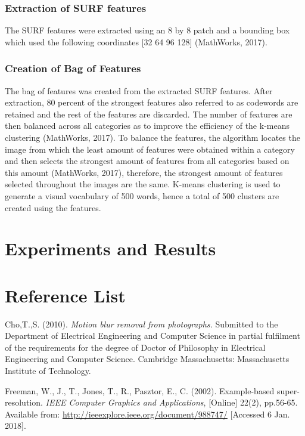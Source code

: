 \documentclass[a4paper, 12pt]{article}
\begin{document}
\subsubsection{Extraction of SURF features}
The SURF features were extracted using an 8 by 8 patch and a bounding box which used the following coordinates [32 64 96 128] (MathWorks, 2017). 

\subsubsection{Creation of Bag of Features}
The bag of features was created from the extracted SURF features. After extraction, 80 percent of the strongest features also referred to as codewords are retained and the rest of the features are discarded. The number of features are then balanced across all categories as to improve the efficiency of the k-means clustering (MathWorks, 2017). To balance the features, the algorithm locates the image from which the least amount of features were obtained within a category and then selects the strongest amount of features from all categories based on this amount (MathWorks, 2017), therefore, the strongest amount of features selected throughout the images are the same. K-means clustering is used to generate a visual vocabulary of 500 words, hence a total of 500 clusters are created using the features.

\newpage 
\section{ Experiments and Results }


 
\newpage
\section{Reference List} 

Cho,T.,S. (2010). \textit{Motion blur removal from photographs.} Submitted to the Department of Electrical Engineering and Computer Science in partial fulfilment of the requirements for the degree of Doctor of Philosophy in Electrical Engineering and Computer Science. Cambridge Massachusetts: Massachusetts Institute of Technology.
 
Freeman, W., J., T., Jones, T., R.,  Pasztor, E., C. (2002). Example-based super-resolution. \textit{IEEE Computer Graphics and Applications}, [Online] 22(2), pp.56-65. Available from: \url{http://ieeexplore.ieee.org/document/988747/} [Accessed 6 Jan. 2018].
\end{document}
